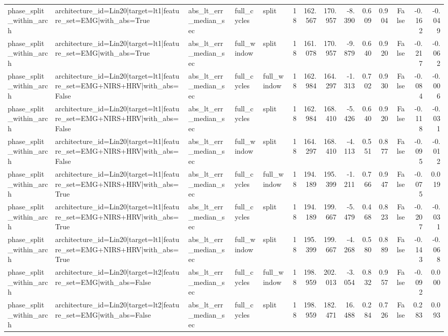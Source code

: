 \begin{table}
\begin{tabular}{lllllrrrrrrrrr}
phase_split_within_arch & architecture_id=Lin20|target=lt1|feature_set=EMG|with_abs=True & abs_lt_err_median_sec & full_cycles & split & 18 & 162.567 & 170.957 & -8.390 & 0.609 & 0.904 & False & -0.162 & -0.049 \\
phase_split_within_arch & architecture_id=Lin20|target=lt1|feature_set=EMG|with_abs=True & abs_lt_err_median_sec & full_window & split & 18 & 161.078 & 170.957 & -9.879 & 0.640 & 0.920 & False & -0.217 & -0.062 \\
phase_split_within_arch & architecture_id=Lin20|target=lt1|feature_set=EMG+NIRS+HRV|with_abs=False & abs_lt_err_median_sec & full_cycles & full_window & 18 & 162.984 & 164.297 & -1.313 & 0.702 & 0.930 & False & -0.084 & -0.006 \\
phase_split_within_arch & architecture_id=Lin20|target=lt1|feature_set=EMG+NIRS+HRV|with_abs=False & abs_lt_err_median_sec & full_cycles & split & 18 & 162.984 & 168.410 & -5.426 & 0.640 & 0.920 & False & -0.118 & -0.031 \\
phase_split_within_arch & architecture_id=Lin20|target=lt1|feature_set=EMG+NIRS+HRV|with_abs=False & abs_lt_err_median_sec & full_window & split & 18 & 164.297 & 168.410 & -4.113 & 0.551 & 0.877 & False & -0.095 & -0.012 \\
phase_split_within_arch & architecture_id=Lin20|target=lt1|feature_set=EMG+NIRS+HRV|with_abs=True & abs_lt_err_median_sec & full_cycles & full_window & 18 & 194.189 & 195.399 & -1.211 & 0.766 & 0.947 & False & -0.075 & 0.019 \\
phase_split_within_arch & architecture_id=Lin20|target=lt1|feature_set=EMG+NIRS+HRV|with_abs=True & abs_lt_err_median_sec & full_cycles & split & 18 & 194.189 & 199.667 & -5.479 & 0.468 & 0.823 & False & -0.207 & -0.031 \\
phase_split_within_arch & architecture_id=Lin20|target=lt1|feature_set=EMG+NIRS+HRV|with_abs=True & abs_lt_err_median_sec & full_window & split & 18 & 195.399 & 199.667 & -4.268 & 0.580 & 0.889 & False & -0.143 & -0.068 \\
phase_split_within_arch & architecture_id=Lin20|target=lt2|feature_set=EMG|with_abs=False & abs_lt_err_median_sec & full_cycles & full_window & 18 & 198.959 & 202.013 & -3.054 & 0.832 & 0.957 & False & -0.092 & 0.000 \\
phase_split_within_arch & architecture_id=Lin20|target=lt2|feature_set=EMG|with_abs=False & abs_lt_err_median_sec & full_cycles & split & 18 & 198.959 & 182.471 & 16.488 & 0.284 & 0.726 & False & 0.283 & 0.093 \\

\end{tabular}
\end{table}
